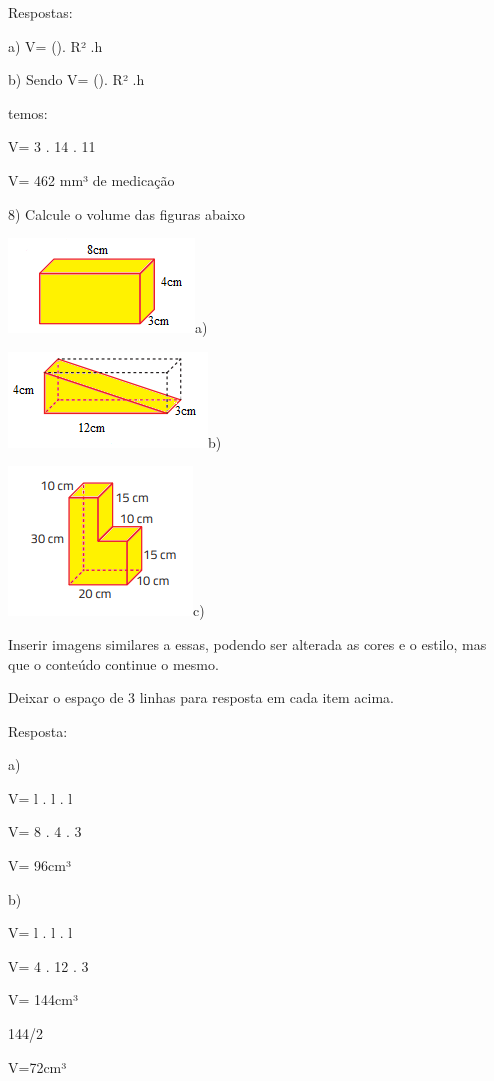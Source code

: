 Respostas:

a) V= (\Pi). R² .h

b) Sendo V= (\Pi). R² .h

temos:

V= 3 . 14 . 11

V= 462 mm³ de medicação

8) Calcule o volume das figuras abaixo

\includegraphics[width=1.94792in,height=0.98958in]{./imgSAEB_8_MAT/media/image51.png}a)

\includegraphics[width=2.08333in,height=1in]{./imgSAEB_8_MAT/media/image52.png}b)

\includegraphics[width=1.92708in,height=1.5625in]{./imgSAEB_8_MAT/media/image53.png}c)

Inserir imagens similares a essas, podendo ser alterada as cores e o
estilo, mas que o conteúdo continue o mesmo.

Deixar o espaço de 3 linhas para resposta em cada item acima.

Resposta:

a)

V= l . l . l

V= 8 . 4 . 3

V= 96cm³

b)

V= l . l . l

V= 4 . 12 . 3

V= 144cm³

144/2

V=72cm³

